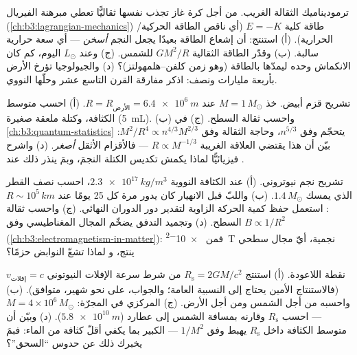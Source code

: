 \begin{exercise}[$\star\star$]\label{exo:b3:astrophysics:5}
ترموديناميك الثقالة الغريب. من أجل كرة غاز
تجذب نفسها ثقاليًّا تعطي مبرهنة الفيريال (\cref{ch:b3:lagrangian-mechanics})
طاقة كلية $E = -K$ (أي ناقص الطاقة الحركية/الحرارية).
(أ) استنتج: أن إشعاع الطاقة بعيدًا يجعل النجم \emph{أسخن}
--- أي سعة حرارية سالبة. (ب) وقدّر الطاقة الثقالية
$GM^2/R$ للشمس. (ج) وعند $L_\odot$ اليوم، كم كان الانكماش
وحده ليمدّها بالطاقة (وهو زمن كلفن--هلمهولتز)؟ (د) والجيولوجيا
تؤرخ الأرض بأربعة مليارات ونصف: اذكر مفارقة
القرن التاسع عشر وحلّها النووي.
\end{exercise}

\begin{exercise}[$\star\star$]\label{exo:b3:astrophysics:6}
تشريح قزم أبيض. خذ $M = 1\,M_\odot$ عند
$R = R_{\text{الأرض}} = \qty{6.4e6}{m}$. (أ) احسب متوسط
الكثافة، وكتلة ملعقة صغيرة (\qty{5}{mL}). (ب) واحسب
ثقالة السطح. (ج)  في
\cref{ch:b3:quantum-statistics} يتحجّم وفق $n^{5/3}$، وحاجة الثقالة وفق
$M^2/R^4 \propto n^{4/3}M^{2/3}$: بيّن أن هذا يقتضي
العلاقة الغريبة $R \propto M^{-1/3}$ --- فالأقزام الأثقل
\emph{أصغر}. (د) واشرح فيزيائيًّا لماذا يكمش تكديس الكتلة
النجمَ، وبمَ ينذر ذلك عند .
\end{exercise}

\begin{exercise}[$\star\star$]\label{exo:b3:astrophysics:7}
تشريح نجم نيوتروني. (أ) عند الكثافة النووية
$\qty{2.3e17}{kg/m^3}$، احسب نصف القطر الذي يمسك
$1.4\,M_\odot$. (ب) واللبّ قبل الانهيار كان يدور مرة كل 25 يومًا
عند $R \sim 10^5\,\unit{km}$: استعمل حفظ كمية الحركة الزاوية
لتقدير دور الدوران النهائي. (ج) واحسب ثقالة
السطح. (د) وتجميد التدفق يضخّم المجال المغناطيسي وفق
$B \propto 1/R^2$ (\cref{ch:b3:electromagnetism-in-matter}):
فمن \qty{e-2}{T} نجمية، أيّ مجال سطحي ينتج، و
لماذا تشعّ النوابض حزمًا؟
\end{exercise}

\begin{exercise}[$\star\star$]\label{exo:b3:astrophysics:8}
نقطة اللاعودة. (أ) استنتج $R_{\text{s}} = 2GM/c^2$ من
شرط سرعة الإفلات النيوتوني $v_{\text{إفلات}} = c$ (فالاستنتاج
الأمين يحتاج إلى النسبية العامة؛ والجواب، على نحو
شهير، متوافق). (ب) واحسبه من أجل الشمس ومن أجل الأرض.
(ج)  المركزي في المجرّة: $M = 4\times10^6\,M_\odot$
--- احسب $R_{\text{s}}$ وقارنه بمسافة الشمس إلى عطارد
($\qty{5.8e10}{m}$). (د) وبيّن أن متوسط الكثافة داخل
$R_{\text{s}}$ يهبط وفق $1/M^2$ ---  الكبير بما يكفي
أقلّ كثافة من الماء: فبمَ يخبرك ذلك عن حدوس ``السحق''؟
\end{exercise}


